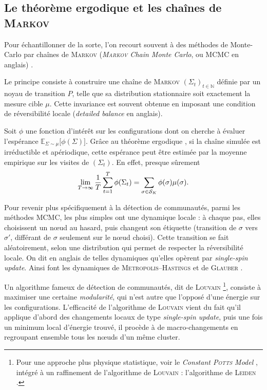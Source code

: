 \subsection{Le théorème ergodique et les chaînes de \textsc{Markov}}

Pour échantillonner de la sorte, l'on recourt souvent à des méthodes de Monte-Carlo par chaînes de \textsc{Markov} (\emph{\textsc{Markov} Chain Monte Carlo}, ou MCMC en anglais) \cite{Robert1996MCMC,JustinSaintFlour2025}.

Le principe consiste à construire une chaîne de \textsc{Markov} $(\Sigma_t)_{t\in\mathbb{N}}$ définie par un noyau de transition $P$, telle que sa distribution stationnaire soit exactement la mesure cible $\mu$. Cette invariance est souvent obtenue en imposant une condition de réversibilité locale (\emph{detailed balance} en anglais).

Soit $\phi$ une fonction d'intérêt sur les configurations dont on cherche à évaluer l'espérance $ \mathbb E_{\Sigma \sim \mu} \bigl[ \phi(\Sigma)\bigr]$.
Grâce au théorème ergodique \cite{JustinSaintFlour2025}, si la chaîne simulée est irréductible et apériodique, cette espérance peut être estimée par la moyenne empirique sur les visites de $(\Sigma_t)$. En effet, presque sûrement
\[
\lim_{T\to\infty} \frac{1}{T} \sum_{t=1}^T \phi(\Sigma_t) = \sum_{\sigma \in \mathcal S_K} \phi(\sigma)\mu(\sigma). 
\]

Pour revenir plus spécifiquement à la détection de communautés, parmi les méthodes MCMC, les plus simples ont une dynamique locale : à chaque pas, elles choisissent un nœud au hasard, puis changent son étiquette (transition de $\sigma $ vers $\sigma'$, différant de $\sigma$ seulement sur le nœud choisi). Cette transition se fait aléatoirement, selon une distribution qui permet de respecter la réversibilité locale.
On dit en anglais de telles dynamiques qu'elles opèrent par \emph{single-spin update}.
Ainsi font les dynamiques de \textsc{Metropolis--Hastings} et de \textsc{Glauber} \cite{GlauberMetropolisDiaconis2009}.


Un algorithme fameux de détection de communautés, dit de \textsc{Louvain} \cite{Louvain2008}\footnote{Pour une approche plus physique statistique, voir le \emph{Constant \textsc{Potts} Model} \cite{ConstantPottsModel}, intégré à un raffinement de l'algorithme de \textsc{Louvain} : l'algorithme de \textsc{Leiden} \cite{Leiden2019}.}, consiste à maximiser une certaine \emph{modularité}, qui n'est autre que l'opposé d'une énergie sur les configurations.
L'efficacité de l'algorithme de \textsc{Louvain}  vient du fait qu'il applique d'abord des changements locaux de type \emph{single-spin update}, puis une fois un minimum local d'énergie trouvé, il procède à de macro-changements en regroupant ensemble tous les nœuds d'un même cluster. 

